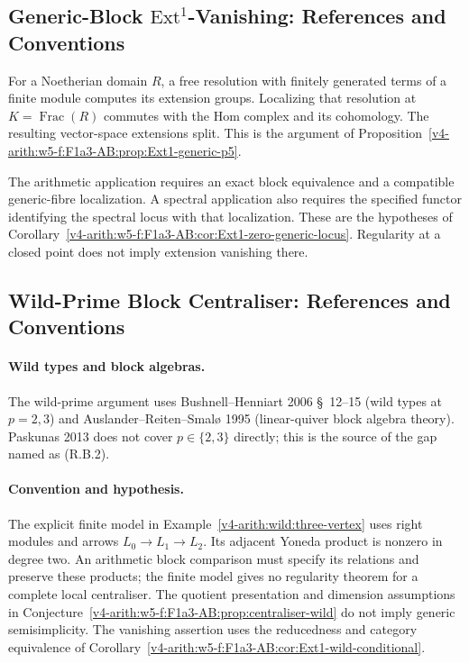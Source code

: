 \subsection{Generic-Block \(\mathrm{Ext}^{1}\)-Vanishing: References and Conventions}
\label{v4-arith:w5-f:F1a3-AB:comparison-ext1-generic}

For a Noetherian domain \(R\), a free resolution with finitely generated terms of a finite
module computes its extension groups. Localizing that resolution at
\(K=\operatorname{Frac}(R)\) commutes with the Hom complex and its
cohomology. The resulting vector-space extensions split. This is the
argument of Proposition~\ref{v4-arith:w5-f:F1a3-AB:prop:Ext1-generic-p5}.

The arithmetic application requires an exact block equivalence and
a compatible generic-fibre localization. A spectral application also
requires the specified functor identifying the spectral locus with
that localization. These are the hypotheses of
Corollary~\ref{v4-arith:w5-f:F1a3-AB:cor:Ext1-zero-generic-locus}.
Regularity at a closed point does not imply extension vanishing there.

\subsection{Wild-Prime Block Centraliser: References and Conventions}
\label{v4-arith:w5-f:F1a3-AB:comparison-wild-prime}

\paragraph{Wild types and block algebras.} The wild-prime argument uses
Bushnell--Henniart 2006 \S~12--15 (wild types at \(p=2,3\)) and
Auslander--Reiten--Smal\o{} 1995 (linear-quiver block algebra theory).
Paskunas 2013 does not cover \(p\in\{2,3\}\) directly; this is the
source of the gap named as (R.B.2).

\paragraph{Convention and hypothesis.}
The explicit finite model in Example~\ref{v4-arith:wild:three-vertex}
uses right modules and arrows \(L_0\to L_1\to L_2\).
Its adjacent Yoneda product is nonzero in degree two. An arithmetic
block comparison must specify its relations and preserve these
products; the finite model gives no regularity theorem for a
complete local centraliser. The quotient presentation and dimension assumptions
in Conjecture~\ref{v4-arith:w5-f:F1a3-AB:prop:centraliser-wild}
do not imply generic semisimplicity. The vanishing assertion uses
the reducedness and category equivalence of
Corollary~\ref{v4-arith:w5-f:F1a3-AB:cor:Ext1-wild-conditional}.

